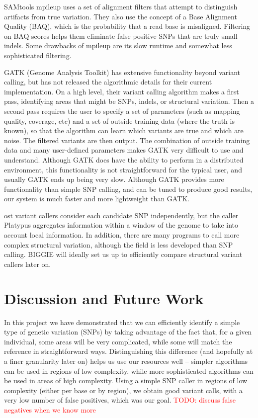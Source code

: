 \documentclass[10pt]{article}
\newcommand\TODO[1]{\textcolor{red}{TODO: #1}}
\begin{document}
SAMtools mpileup uses a set of alignment filters that attempt to distinguish artifacts from true variation. They also use the concept of a Base Alignment Quality (BAQ), which is the probability that a read base is misaligned. Filtering on BAQ scores helps them eliminate false positive SNPs that are truly small indels. Some drawbacks of mpileup are its slow runtime and somewhat less sophisticated filtering.


GATK (Genome Analysis Toolkit) has extensive functionality beyond variant calling, but has not released the algorithmic details for their current implementation. On a high level, their variant calling algorithm makes a first pass, identifying areas that might be SNPs, indels, or structural variation. Then a second pass requires the user to specify a set of parameters (such as mapping quality, coverage, etc) and a set of outside training data (where the truth is known), so that the algorithm can learn which variants are true and which are noise. The filtered variants are then output. The combination of outside training data and many user-defined parameters makes GATK very difficult to use and understand. Although
GATK does have the ability to perform in a distributed environment, this
functionality is not straightforward for the typical user, and usually GATK
ends up being very slow.  Although GATK provides more functionality than simple
SNP calling, and can be tuned to produce good results, our system is much faster and more
lightweight than GATK.

ost variant callers consider each candidate SNP independently, but the caller
Platypus aggregates information within a window of the genome to take into
account local information. In addition, there are many programs to call more
complex structural variation, although the field is less developed than SNP
calling.  BIGGIE will ideally set us up to efficiently compare structural variant callers later on.

\section{Discussion and Future Work}

In this project we have demonstrated that we can efficiently identify a simple type of genetic variation (SNPs) by taking advantage of the fact that, for a given individual, some areas will be very complicated, while some will match the reference in straightforward ways. Distinguishing this difference (and hopefully at a finer granularity later on) helps us use our resources well -- simpler algorithms can be used in regions of low complexity, while more sophisticated algorithms can be used in areas of high complexity. Using a simple SNP caller in regions of low complexity (either per base or by region), we obtain good variant calls, with a very low number of false positives, which was our goal. 
\TODO{discuss false negatives when we know more}
\end{document}
